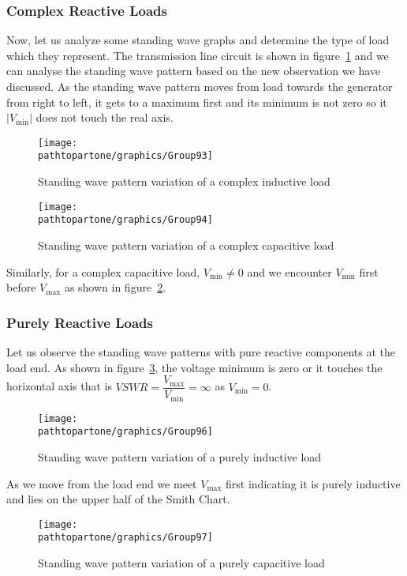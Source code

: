 \subsubsection{Complex Reactive Loads}
Now, let us analyze some standing wave graphs and determine the type of load which they represent. The transmission line circuit is shown in figure~\ref{fig:group93} and we can analyse the standing wave pattern based on the new observation we have discussed. As the standing wave pattern moves from load towards the generator from right to left, it gets to a maximum first and its minimum is not zero so it $|V_\min|$ does not touch the real axis.
\begin{figure}[h]
\centering
\texttt{[image: \\pathtopartone/graphics/Group93]}
\caption{Standing wave pattern variation of a complex inductive load}
\label{fig:group93}
\end{figure}
\begin{figure}[h]
\centering
\texttt{[image: \\pathtopartone/graphics/Group94]}
\caption{Standing wave pattern variation of a complex capacitive load}
\label{fig:group94}
\end{figure}

Similarly, for a complex capacitive load, $V_\min\neq0$ and we encounter $V_\min$ first before $V_\max$ as shown in figure~\ref{fig:group94}. 

\subsubsection{Purely Reactive Loads}
Let us observe the standing wave patterns with pure reactive components at the load end. As shown in figure~\ref{fig:group96}, the voltage minimum is zero or it touches the horizontal axis that is ${VSWR=\dfrac{V_\max}{V_\min}=\infty}$ as ${V_\min=0}$.
\begin{figure}[h]
\centering
\texttt{[image: \\pathtopartone/graphics/Group96]}
\caption{Standing wave pattern variation of a purely inductive load}
\label{fig:group96}
\end{figure}

As we move from the load end we meet ${V_\max}$ first indicating it is purely inductive and lies on the upper half of the Smith Chart.
\begin{figure}[h]
\centering
\texttt{[image: \\pathtopartone/graphics/Group97]}
\caption{Standing wave pattern variation of a purely capacitive load}
\label{fig:group97}
\end{figure}

